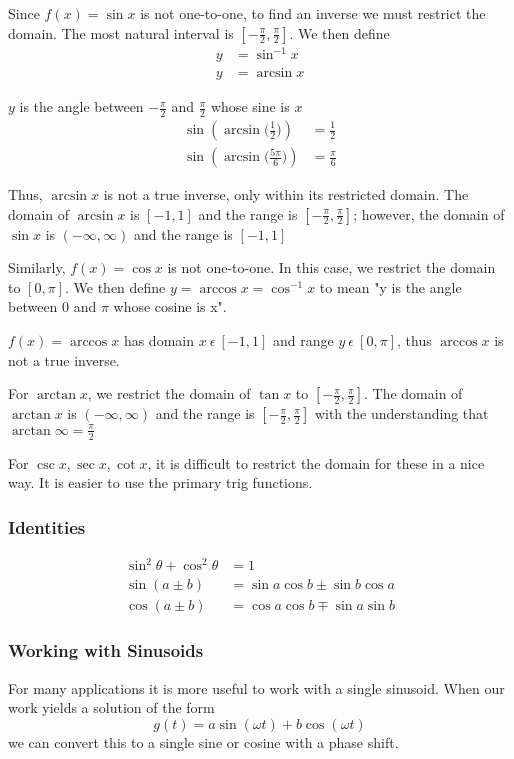 \documentclass[12pt]{article}
\begin{document}
Since $f(x)=\sin x$ is not one-to-one, to find an inverse we must restrict the domain. The most natural interval is $[-\frac{\pi}{2},\frac{\pi}{2}]$. We then define
\begin{align*}
y &= \sin^{-1}x\\
y &= \arcsin x
\end{align*}

$y$ is the angle between $-\frac{\pi}{2}$ and $\frac{\pi}{2}$ whose sine is $x$
\begin{align*}
\sin(\arcsin\bigg(\frac{1}{2}\bigg)) &= \frac{1}{2}\\
\sin(\arcsin\bigg(\frac{5\pi}{6}\bigg)) &= \frac{\pi}{6}
\end{align*}

Thus, $\arcsin x$ is not a true inverse, only within its restricted domain. The domain of $\arcsin x$ is $[-1,1]$ and the range is $[-\frac{\pi}{2},\frac{\pi}{2}]$; however, the domain of $\sin x$ is $(-\infty,\infty)$ and the range is $[-1,1]$

Similarly, $f(x) = \cos x$ is not one-to-one. In this case, we restrict the domain to $[0,\pi]$. We then define $y=\arccos x=\cos^{-1}x$ to mean "y is the angle between 0 and $\pi$ whose cosine is x".

$f(x) = \arccos x$ has domain $x\ \epsilon\ [-1,1]$ and range $y\ \epsilon\ [0,\pi]$, thus $\arccos x$ is not a true inverse.

For $\arctan x$, we restrict the domain of $\tan x$ to $[-\frac{\pi}{2},\frac{\pi}{2}]$. The domain of $\arctan x$ is $(-\infty,\infty)$ and the range is $[-\frac{\pi}{2},\frac{\pi}{2}]$ with the understanding that $\arctan\infty = \frac{\pi}{2}$

For $\csc{x}, \sec{x}, \cot{x}$, it is difficult to restrict the domain for these in a nice way. It is easier to use the primary trig functions.

\subsubsection*{Identities}
\begin{align*}
\sin^2\theta + \cos^2\theta &= 1\\
\sin(a\pm b) &= \sin a\cos b \pm \sin b\cos a\\
\cos(a\pm b) &= \cos a\cos b \mp \sin a\sin b
\end{align*}

\subsubsection*{Working with Sinusoids}
For many applications it is more useful to work with a single sinusoid. When our work yields a solution of the form \[ g(t) = a\sin(\omega t) + b\cos(\omega t) \] we can convert this to a single sine or cosine with a phase shift.
\end{document}
